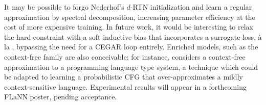 \documentclass[usletter,11pt]{article}
\begin{document}
It may be possible to forgo Nederhof's $d$-RTN initialization and learn a regular approximation by spectral decomposition, increasing parameter efficiency at the cost of more expensive training. In future work, it would be interesting to relax the hard constraint with a soft inductive bias that incorporates a surrogate loss, \`a la \cite{wilson2025deep}, bypassing the need for a CEGAR loop entirely. Enriched models, such as the context-free family are also conceivable; for instance, \cite{considine2025word} considers a context-free approximation to a programming language type system, a technique which could be adapted to learning a probabilistic CFG that over-approximates a mildly context-sensitive language. Experimental results will appear in a forthcoming FLaNN poster, pending acceptance.

\begin{figure}[ht]
  \vspace{-0.27cm}
  \centering
  \begin{minipage}{0.48\textwidth}
    \centering
\end{minipage}
\end{figure}
\end{document}
